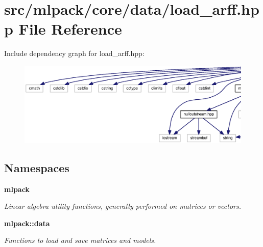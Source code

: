 \section{src/mlpack/core/data/load\+\_\+arff.hpp File Reference}
\label{load__arff_8hpp}
Include dependency graph for load\+\_\+arff.\+hpp\+:
\nopagebreak
\begin{figure}[H]
\begin{center}
\leavevmode
\includegraphics[width=350pt]{load__arff_8hpp__incl}
\end{center}
\end{figure}
\subsection*{Namespaces}
\begin{DoxyCompactItemize}
\item 
 {\bf mlpack}
\begin{DoxyCompactList}\small\item\em Linear algebra utility functions, generally performed on matrices or vectors. \end{DoxyCompactList}\item 
 {\bf mlpack\+::data}
\begin{DoxyCompactList}\small\item\em Functions to load and save matrices and models. \end{DoxyCompactList}\end{DoxyCompactItemize}
